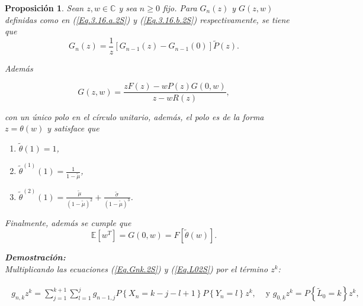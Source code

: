 \documentclass{article}
\newtheorem{Prop}{Proposición}[section]
\newcommand{\esp}{\mathbb{E}}
\numberwithin{equation}{section}
\begin{document}
\begin{Prop}\label{Prop.1.1.2S}
Sean $z,w\in\mathbb{C}$ y sea $n\geq0$ fijo. Para $G_{n}\left(z\right)$ y $G\left(z,w\right)$ definidas como en (\ref{Eq.3.16.a.2S}) y (\ref{Eq.3.16.b.2S}) respectivamente, se tiene que
\begin{equation}\label{Eq.Pag.45}
G_{n}\left(z\right)=\frac{1}{z}\left[G_{n-1}\left(z\right)-G_{n-1}\left(0\right)\right]\tilde{P}\left(z\right).
\end{equation}

Adem\'as

\begin{equation}\label{Eq.Pag.46}
G\left(z,w\right)=\frac{zF\left(z\right)-wP\left(z\right)G\left(0,w\right)}{z-wR\left(z\right)},
\end{equation}

con un \'unico polo en el c\'irculo unitario, adem\'as, el polo es
de la forma $z=\theta\left(w\right)$ y satisface que

\begin{enumerate}
\item[i)]$\tilde{\theta}\left(1\right)=1$,

\item[ii)] $\tilde{\theta}^{(1)}\left(1\right)=\frac{1}{1-\tilde{\mu}}$,

\item[iii)]
$\tilde{\theta}^{(2)}\left(1\right)=\frac{\tilde{\mu}}{\left(1-\tilde{\mu}\right)^{2}}+\frac{\tilde{\sigma}}{\left(1-\tilde{\mu}\right)^{3}}$.
\end{enumerate}

Finalmente, adem\'as se cumple que
\begin{equation}
\esp\left[w^{T}\right]=G\left(0,w\right)=F\left[\tilde{\theta}\left(w\right)\right].
\end{equation}

\textbf{Demostraci\'on:}\\
Multiplicando las ecuaciones (\ref{Eq.Gnk.2S}) y (\ref{Eq.L02S}) por el t\'ermino $z^{k}$:

\begin{eqnarray*}
\begin{array}{ll}
g_{n,k}z^{k}=\sum_{j=1}^{k+1}\sum_{l=1}^{j}g_{n-1,j}P\left\{X_{n}=k-j-l+1\right\}P\left\{Y_{n}=l\right\}z^{k},&\textrm{ y  }g_{0,k}z^{k}=P\left\{\tilde{L}_{0}=k\right\}z^{k},

\end{array}
\end{eqnarray*}


\end{Prop}
\end{document}
